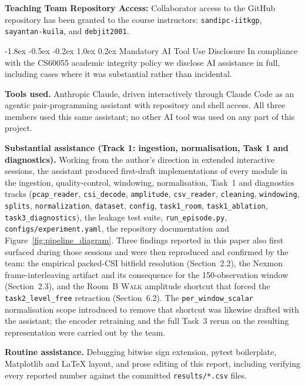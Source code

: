 \documentclass[10pt,a4paper]{article}
\makeatletter
\renewcommand{\section}{\@startsection{section}{1}{\z@}%
  {-1.8ex \@plus -0.5ex \@minus -0.2ex}%
  {1.0ex \@plus 0.2ex}%
  {\normalfont\large\bfseries\color{primary}}}
\makeatother
\begin{document}
\noindent\textbf{Teaching Team Repository Access:} Collaborator access to the GitHub repository has been granted to the course instructors: \texttt{sandipc-iitkgp}, \texttt{sayantan-kuila}, and \texttt{debjit2001}.

\section{Mandatory AI Tool Use Disclosure}
In compliance with the CS60055 academic integrity policy we disclose AI assistance in full, including
cases where it was substantial rather than incidental.

\noindent\textbf{Tools used.} Anthropic Claude, driven interactively through Claude Code as an agentic
pair-programming assistant with repository and shell access. All three members used this same assistant;
no other AI tool was used on any part of this project.

\noindent\textbf{Substantial assistance (Track 1: ingestion, normalisation, Task 1 and diagnostics).}
Working from the author's direction in extended interactive sessions, the assistant produced first-draft
implementations of every module in the ingestion, quality-control, windowing, normalisation, Task~1 and
diagnostics tracks (\texttt{pcap\_reader}, \texttt{csi\_decode}, \texttt{amplitude}, \texttt{csv\_reader},
\texttt{cleaning}, \texttt{windowing}, \texttt{splits}, \texttt{normalization}, \texttt{dataset},
\texttt{config}, \texttt{task1\_room}, \texttt{task1\_ablation}, \texttt{task3\_diagnostics}), the
leakage test suite, \texttt{run\_episode.py}, \texttt{configs/experiment.yaml}, the repository
documentation and Figure~\ref{fig:pipeline_diagram}.
Three findings reported in this paper also first surfaced during those sessions and were then reproduced
and confirmed by the team: the empirical packed-CSI bitfield resolution (Section~2.2), the Nexmon
frame-interleaving artifact and its consequence for the 150-observation window (Section~2.3), and the
Room~B \textsc{Walk} amplitude shortcut that forced the \texttt{task2\_level\_free} retraction
(Section~6.2). The \texttt{per\_window\_scalar} normalisation scope introduced to remove that shortcut was
likewise drafted with the assistant; the encoder retraining and the full Task~3 rerun on the resulting
representation were carried out by the team.

\noindent\textbf{Routine assistance.} Debugging bitwise sign extension, pytest boilerplate, Matplotlib and
\LaTeX{} layout, and prose editing of this report, including verifying every reported number against the
committed \texttt{results/*.csv} files.
\end{document}
